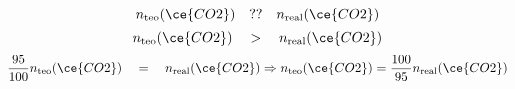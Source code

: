 \begin{frame}
{        \begin{overprint}
                $$
                    n_{\text{teo}}(\ce{CO2})
                    \quad ??\quad 
                    n_{\text{real}}(\ce{CO2})
                $$
                $$
                    n_{\text{teo}}(\ce{CO2})
                    \quad >\quad 
                    n_{\text{real}}(\ce{CO2})
                $$
                $$
                    \frac{95}{100}
                    n_{\text{teo}}(\ce{CO2})
                    \quad =\quad
                    n_{\text{real}}(\ce{CO2})
                    \Rightarrow
                    n_{\text{teo}}(\ce{CO2})
                    =
                    \frac{100}{95}
                    n_{\text{real}}(\ce{CO2})
                $$
        \end{overprint}
            }
\end{frame}

